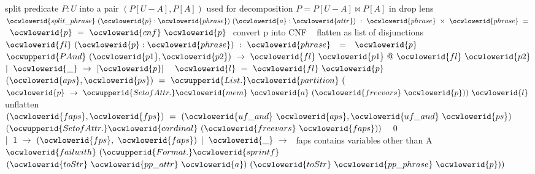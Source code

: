 \documentclass[12pt]{article}
\begin{document}
\ocwendcode{}\ocwindent{0.00em}
split predicate $P:U$ into a pair $(P[U-A],P[A])$ 
\ocweol
\ocwindent{0.00em}
used for decomposition $P= P[U-A] \bowtie P[A]$ in drop lens  
\ocweol
\label{rellens.ml:39905}%
\medskip
\ocwbegincode{}\ocwindent{0.00em}
~$\ocwlowerid{split\_phrase}~(\ocwlowerid{p}:\ocwlowerid{phrase})~(\ocwlowerid{a}:\ocwlowerid{attr})~:~\ocwlowerid{phrase}~\times{}~\ocwlowerid{phrase}~=~$\ocweol
\ocwindent{0.50em}
~$\ocwlowerid{p}~=~\ocwlowerid{cnf}~\ocwlowerid{p}~$\ocwbc{} convert p into CNF \ocwec{}~\ocweol
\ocwindent{0.50em}
\ocwbc{} flatten as list of disjunctions \ocwec{}\ocweol
\ocwindent{0.50em}
~~$\ocwlowerid{fl}~(\ocwlowerid{p}:\ocwlowerid{phrase})~:~\ocwlowerid{phrase}~$~=~~$\ocwlowerid{p}~$\ocweol
\ocwindent{1.50em}
$\ocwupperid{PAnd}~(\ocwlowerid{p1},\ocwlowerid{p2})~\rightarrow{}~\ocwlowerid{fl}~\ocwlowerid{p1}~@~\ocwlowerid{fl}~\ocwlowerid{p2}$\ocweol
\ocwindent{0.50em}
$\mid{}~\ocwlowerid{\_}~\rightarrow{}~[\ocwlowerid{p}]~$\ocweol
\ocwindent{0.50em}
~$\ocwlowerid{l}~=~\ocwlowerid{fl}~\ocwlowerid{p}~$\ocweol
\ocwindent{0.50em}
~$(\ocwlowerid{aps},\ocwlowerid{ps})~=~\ocwupperid{List.}\ocwlowerid{partition}~($~$\ocwlowerid{p}~\rightarrow{}~\ocwupperid{SetofAttr.}\ocwlowerid{mem}~\ocwlowerid{a}~(\ocwlowerid{freevars}~\ocwlowerid{p}))~\ocwlowerid{l}~$\ocweol
\ocwindent{1.00em}
\ocwbc{} unflatten \ocwec{}\ocweol
\ocwindent{0.50em}
~$(\ocwlowerid{faps},\ocwlowerid{fps})~=~(\ocwlowerid{uf\_and}~\ocwlowerid{aps},\ocwlowerid{uf\_and}~\ocwlowerid{ps})~$\ocweol
\ocwindent{0.50em}
~$(\ocwupperid{SetofAttr.}\ocwlowerid{cardinal}~(\ocwlowerid{freevars}~\ocwlowerid{faps}))~$~\ocweol
\ocwindent{1.50em}
0~$\mid{}~1~\rightarrow{}~(\ocwlowerid{fps},~\ocwlowerid{faps})$\ocweol
\ocwindent{0.50em}
$\mid{}~\ocwlowerid{\_}~\rightarrow{}~$\ocwbc{} faps contains variables other than A \ocwec{}\ocweol
\ocwindent{2.50em}
$\ocwlowerid{failwith}~(\ocwupperid{Format.}\ocwlowerid{sprintf}~$\ocweol
\ocwindent{3.50em}
\ocweol
\ocwindent{8.50em}
$(\ocwlowerid{toStr}~\ocwlowerid{pp\_attr}~\ocwlowerid{a})~(\ocwlowerid{toStr}~\ocwlowerid{pp\_phrase}~\ocwlowerid{p}))$\medskip
\end{document}
